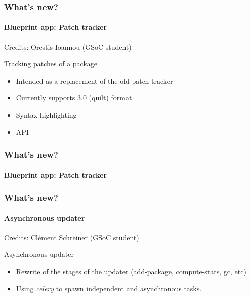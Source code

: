 \documentclass{beamer}
\begin{document}
\begin{frame}
  \frametitle{What's new?}
  \framesubtitle{Blueprint app: Patch tracker}
  Credits: Orestis Ioannou (GSoC student)

  \begin{block}{Tracking patches of a package}
    \begin{itemize}
    \item Intended as a replacement of the old patch-tracker
      \pause
    \item Currently supports 3.0 (quilt) format
      \pause
    \item Syntax-highlighting
      \pause
    \item API
    \end{itemize}
  \end{block}
\end{frame}

\begin{frame}
  \frametitle{What's new?}
  \framesubtitle{Blueprint app: Patch tracker}
\end{frame}


\begin{frame}
  \frametitle{What's new?}
  \framesubtitle{Asynchronous updater}
  Credits: Clément Schreiner (GSoC student)

  \begin{block}{Asynchronous updater}
    \begin{itemize}
    \item Rewrite of the stages of the updater (add-package,
      compute-stats, gc, etc)
    \item Using \textit{celery} to spawn independent and asynchronous tasks.
    \end{itemize}
  \end{block}
\end{frame}
\end{document}

